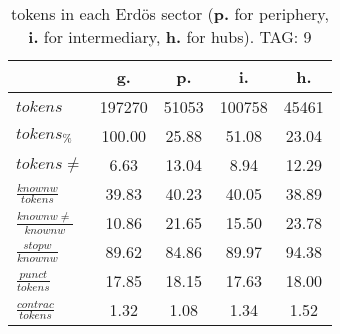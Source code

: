 \begin{table}[h!]
\begin{center}
\begin{tabular}{| l | c | c | c | c |}\hline
 & g. & p. & i. & h. \\\hline
$tokens$ & 197270  & 51053  & 100758  & 45461 \\\hline
$tokens_{\%}$ & 100.00  & 25.88  & 51.08  & 23.04 \\\hline
$tokens \neq$ & 6.63  & 13.04  & 8.94  & 12.29 \\\hline
$\frac{knownw}{tokens}$ & 39.83  & 40.23  & 40.05  & 38.89 \\\hline
$\frac{knownw \neq}{knownw}$ & 10.86  & 21.65  & 15.50  & 23.78 \\\hline
$\frac{stopw}{knownw}$ & 89.62  & 84.86  & 89.97  & 94.38 \\\hline
$\frac{punct}{tokens}$ & 17.85  & 18.15  & 17.63  & 18.00 \\\hline
$\frac{contrac}{tokens}$ & 1.32  & 1.08  & 1.34  & 1.52 \\\hline
\end{tabular}
\caption{tokens in each Erd\"os sector ({{\bf p.}} for periphery, {{\bf i.}} for intermediary, 
    {{\bf h.}} for hubs). TAG: 9}
\end{center}
\end{table}